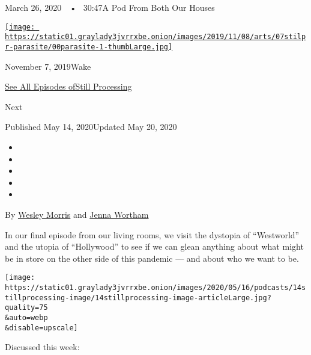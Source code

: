 March 26, 2020~~•~ 30:47A Pod From Both Our Houses

\href{https://www.nytimes3xbfgragh.onion/2019/11/07/podcasts/still-processing-parasite-watchmen-bong-joon-ho.html?action=click\&module=audio-series-bar\&region=header\&pgtype=Article}{\texttt{[image: https://static01.graylady3jvrrxbe.onion/images/2019/11/08/arts/07stilpr-parasite/00parasite-1-thumbLarge.jpg]}}

November 7, 2019Wake

\href{https://www.nytimes3xbfgragh.onion/column/still-processing-podcast}{See
All Episodes ofStill Processing}

Next

Published May 14, 2020Updated May 20, 2020

\begin{itemize}
\item
\item
\item
\item
\item
\end{itemize}

By \href{https://www.nytimes3xbfgragh.onion/by/wesley-morris}{Wesley
Morris} and
\href{https://www.nytimes3xbfgragh.onion/by/jenna-wortham}{Jenna
Wortham}

In our final episode from our living rooms, we visit the dystopia of
``Westworld'' and the utopia of ``Hollywood'' to see if we can glean
anything about what might be in store on the other side of this pandemic
--- and about who we want to be.

\texttt{[image: https://static01.graylady3jvrrxbe.onion/images/2020/05/16/podcasts/14stillprocessing-image/14stillprocessing-image-articleLarge.jpg?quality=75\\\&auto=webp\\\&disable=upscale]}

Discussed this week:

